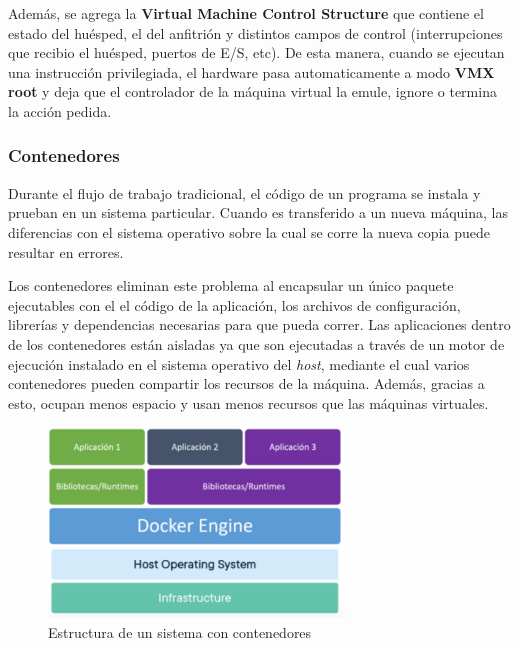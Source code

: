 Además, se agrega la \textbf{Virtual Machine Control Structure} que contiene el estado del huésped, el del anfitrión y distintos campos de control (interrupciones que recibio el huésped, puertos de E/S, etc). De esta manera, cuando se ejecutan una instrucción privilegiada, el hardware pasa automaticamente a modo \textbf{VMX root} y deja que el controlador de la máquina virtual la emule, ignore o termina la acción pedida.

\subsubsection{Contenedores}
Durante el flujo de trabajo tradicional, el código de un programa se instala y prueban en un sistema particular. Cuando es transferido a un nueva máquina, las diferencias con el sistema operativo sobre la cual se corre la nueva copia puede resultar en errores.

Los contenedores eliminan este problema al encapsular un único paquete ejecutables con el el código de la aplicación, los archivos de configuración, librerías y dependencias necesarias para que pueda correr. Las aplicaciones dentro de los contenedores están aisladas ya que son ejecutadas a través de un motor de ejecución instalado en el sistema operativo del \textit{host}, mediante el cual varios contenedores pueden compartir los recursos de la máquina. Además, gracias a esto, ocupan menos espacio y usan menos recursos que las máquinas virtuales.
\begin{figure}
	\centering	
	\includegraphics[width=0.7\textwidth]{imagenes/contenedores}
	\caption{Estructura de un sistema con contenedores}
	\label{fig:contenedores}
\end{figure}
	